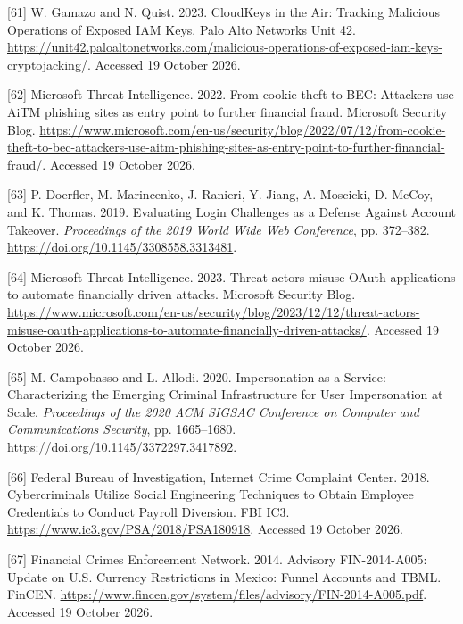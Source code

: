 \documentclass[
  11pt,
]{article}
\newlength{\cslhangindent}
\newlength{\cslentryspacingunit} %
\newenvironment{CSLReferences}[2] %
 {%
  \setlength{\parindent}{0pt}
  \ifodd #1
  \let\oldpar\par
  \def\par{\hangindent=\cslhangindent\oldpar}
  \fi
  \setlength{\parskip}{#2\cslentryspacingunit}
 }%
 {}
\begin{document}
\begin{CSLReferences}{1}{1}
\leavevmode{}%
{[}61{]} W. Gamazo and N. Quist. 2023. CloudKeys in the Air: Tracking
Malicious Operations of Exposed IAM Keys. Palo Alto Networks Unit 42.
\url{https://unit42.paloaltonetworks.com/malicious-operations-of-exposed-iam-keys-cryptojacking/}.
Accessed 19 October 2026.

\leavevmode{}%
{[}62{]} Microsoft Threat Intelligence. 2022. From cookie theft to BEC:
Attackers use AiTM phishing sites as entry point to further financial
fraud. Microsoft Security Blog.
\url{https://www.microsoft.com/en-us/security/blog/2022/07/12/from-cookie-theft-to-bec-attackers-use-aitm-phishing-sites-as-entry-point-to-further-financial-fraud/}.
Accessed 19 October 2026.

\leavevmode{}%
{[}63{]} P. Doerfler, M. Marincenko, J. Ranieri, Y. Jiang, A. Moscicki,
D. McCoy, and K. Thomas. 2019. Evaluating Login Challenges as a Defense
Against Account Takeover. \emph{Proceedings of the 2019 World Wide Web
Conference}, pp. 372--382.
\url{https://doi.org/10.1145/3308558.3313481}.

\leavevmode{}%
{[}64{]} Microsoft Threat Intelligence. 2023. Threat actors misuse OAuth
applications to automate financially driven attacks. Microsoft Security
Blog.
\url{https://www.microsoft.com/en-us/security/blog/2023/12/12/threat-actors-misuse-oauth-applications-to-automate-financially-driven-attacks/}.
Accessed 19 October 2026.

\leavevmode{}%
{[}65{]} M. Campobasso and L. Allodi. 2020. Impersonation-as-a-Service:
Characterizing the Emerging Criminal Infrastructure for User
Impersonation at Scale. \emph{Proceedings of the 2020 ACM SIGSAC
Conference on Computer and Communications Security}, pp. 1665--1680.
\url{https://doi.org/10.1145/3372297.3417892}.

\leavevmode{}%
{[}66{]} Federal Bureau of Investigation, Internet Crime Complaint
Center. 2018. Cybercriminals Utilize Social Engineering Techniques to
Obtain Employee Credentials to Conduct Payroll Diversion. FBI IC3.
\url{https://www.ic3.gov/PSA/2018/PSA180918}. Accessed 19 October 2026.

\leavevmode{}%
{[}67{]} Financial Crimes Enforcement Network. 2014. Advisory
\mbox{FIN-2014}-A005: Update on U.S. Currency Restrictions in Mexico:
Funnel Accounts and TBML. FinCEN.
\url{https://www.fincen.gov/system/files/advisory/FIN-2014-A005.pdf}.
Accessed 19 October 2026.


\end{CSLReferences}
\end{document}

